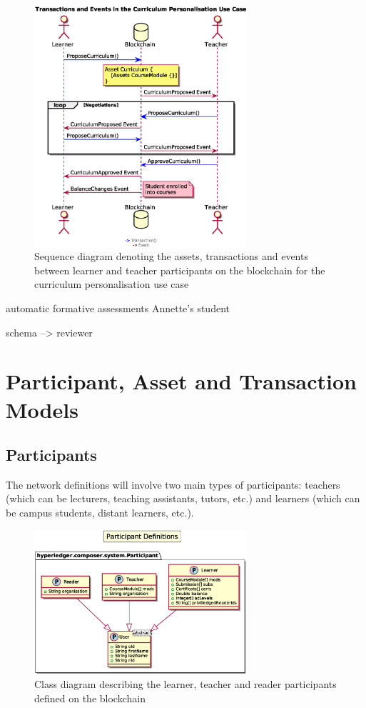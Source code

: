 \begin{figure}[!ht] 
    \centering    
    \includegraphics[width=0.7\textwidth]{personalisationloop}
    \caption[Curriculum Personalisation Use Case]
        {Sequence diagram denoting the assets, transactions and events between 
         learner and teacher participants on the blockchain for the curriculum personalisation use case} 
    \label{fig:personalisationloop}
\end{figure}

automatic formative assessments Annette's student

schema --> reviewer

\section{Participant, Asset and Transaction Models}

\subsection{Participants}

The network definitions will involve two main types of participants: teachers (which can be lecturers, 
teaching assistants, tutors, etc.) and learners (which can be campus students, distant learners, etc.).

\begin{figure}[!hb] 
    \centering    
    \includegraphics[width=0.7\textwidth]{participants}
    \caption[Participants Class Diagram]
        {Class diagram describing the learner, teacher and reader participants defined on the blockchain} 
    \label{fig:participants}
\end{figure}

